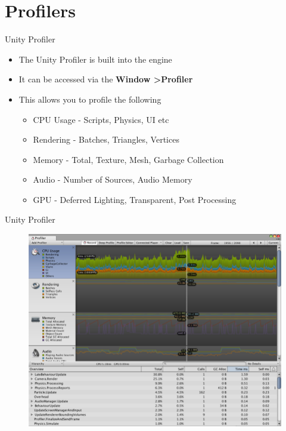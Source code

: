 \part{Profilers}
\frame{\partpage}

\begin{frame}{Unity Profiler}
	\begin{itemize}
		\pause \item The Unity Profiler is built into the engine
		\pause \item It can be accessed via the \textbf{ Window \textgreater  Profiler}
		\pause \item This allows you to profile the following
		\begin{itemize}
			\pause \item CPU Usage - Scripts, Physics, UI etc
			\pause \item Rendering - Batches, Triangles, Vertices
			\pause \item Memory - Total, Texture, Mesh, Garbage Collection
			\pause \item Audio - Number of Sources, Audio Memory
			\pause \item GPU - Deferred Lighting, Transparent, Post Processing
		\end{itemize} 
	\end{itemize}
\end{frame}

\begin{frame}{Unity Profiler}
	\begin{figure}
		\includegraphics[width=1.0\textwidth,height=0.8\textheight]{UnityProfilerWindow}  
	\end{figure}
\end{frame}

